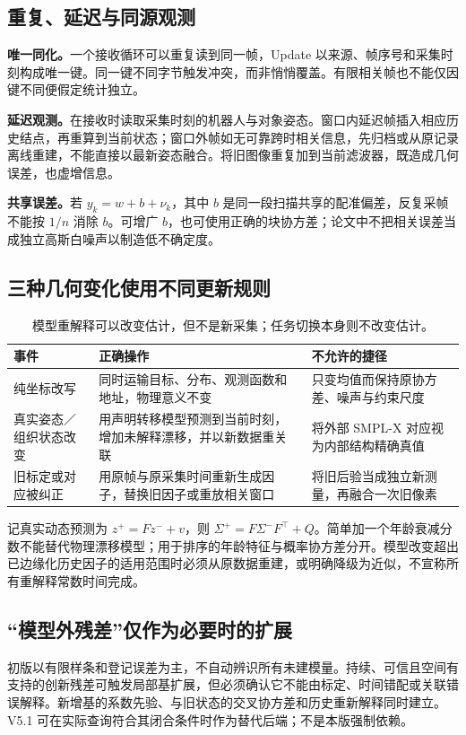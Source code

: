 \documentclass[UTF8,11pt,a4paper,fontset=fandol]{ctexart}
\numberwithin{equation}{section}
\theoremstyle{definition}
\begin{document}
\subsection{重复、延迟与同源观测}
\textbf{唯一同化。}一个接收循环可以重复读到同一帧，Update 以来源、帧序号和采集时刻构成唯一键。同一键不同字节触发冲突，而非悄悄覆盖。有限相关帧也不能仅因键不同便假定统计独立。

\textbf{延迟观测。}在接收时读取采集时刻的机器人与对象姿态。窗口内延迟帧插入相应历史结点，再重算到当前状态；窗口外帧如无可靠跨时相关信息，先归档或从原记录离线重建，不能直接以最新姿态融合。将旧图像重复加到当前滤波器，既造成几何误差，也虚增信息。

\textbf{共享误差。}若 $y_k=w+b+\nu_k$，其中 $b$ 是同一段扫描共享的配准偏差，反复采帧不能按 $1/n$ 消除 $b$。可增广 $b$，也可使用正确的块协方差；论文中不把相关误差当成独立高斯白噪声以制造低不确定度。

\subsection{三种几何变化使用不同更新规则}
\begin{table}[htbp]\centering\small
\begin{tabularx}{\linewidth}{P{27mm}YY}
\toprule
事件 & 正确操作 & 不允许的捷径\\\midrule
纯坐标改写 & 同时运输目标、分布、观测函数和地址，物理意义不变 & 只变均值而保持原协方差、噪声与约束尺度\\
真实姿态／组织状态改变 & 用声明转移模型预测到当前时刻，增加未解释漂移，并以新数据重关联 & 将外部 SMPL-X 对应视为内部结构精确真值\\
旧标定或对应被纠正 & 用原帧与原采集时间重新生成因子，替换旧因子或重放相关窗口 & 将旧后验当成独立新测量，再融合一次旧像素\\\bottomrule
\end{tabularx}
\caption{模型重解释可以改变估计，但不是新采集；任务切换本身则不改变估计。}
\end{table}

记真实动态预测为 $z^+=Fz^-+v$，则 $\Sigma^+=F\Sigma^-F^\top+Q$。简单加一个年龄衰减分数不能替代物理漂移模型；用于排序的年龄特征与概率协方差分开。模型改变超出已边缘化历史因子的适用范围时必须从原数据重建，或明确降级为近似，不宣称所有重解释常数时间完成。

\subsection{“模型外残差”仅作为必要时的扩展}
初版以有限样条和登记误差为主，不自动辨识所有未建模量。持续、可信且空间有支持的创新残差可触发局部基扩展，但必须确认它不能由标定、时间错配或关联错误解释。新增基的系数先验、与旧状态的交叉协方差和历史重新解释同时建立。V5.1 可在实际查询符合其闭合条件时作为替代后端；不是本版强制依赖。
\end{document}
